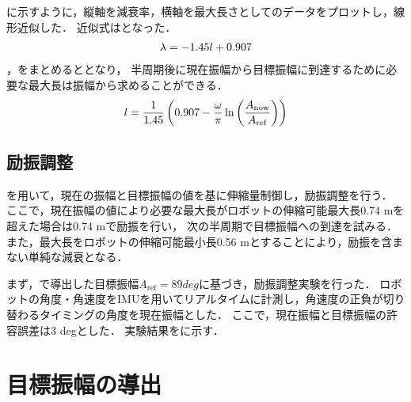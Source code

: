         \figref{}に示すように，縦軸を減衰率，横軸を最大長さとしてのデータをプロットし，線形近似した．
        近似式はとなった．
        \begin{eqnarray}
          \equlabel{length relation}
          \lambda=-1.45l+0.907
        \end{eqnarray}
        ，をまとめるととなり，
        半周期後に現在振幅から目標振幅に到達するために必要な最大長は振幅から求めることができる．
        \begin{eqnarray}
          \equlabel{l status}
          l=\frac{1}{1.45}\left(0.907-\frac{\omega}{\pi}\ln{\left(\frac{A_{\mathrm{now}}}{A_{\mathrm{ref}}}\right)}\right)
        \end{eqnarray}
        

        \subsection{励振調整}
        
        を用いて，現在の振幅と目標振幅の値を基に伸縮量制御し，励振調整を行う．
        ここで，現在振幅の値により必要な最大長がロボットの伸縮可能最大長0.74 mを超えた場合は0.74 mで励振を行い，
        次の半周期で目標振幅への到達を試みる．
        また，最大長をロボットの伸縮可能最小長0.56 mとすることにより，励振を含まない単純な減衰となる．

        まず，で導出した目標振幅$A_{\mathrm{ref}}=89 deg$に基づき，励振調整実験を行った．
        ロボットの角度・角速度をIMUを用いてリアルタイムに計測し，角速度の正負が切り替わるタイミングの角度を現在振幅とした．
        ここで，現在振幅と目標振幅の許容誤差は3 degとした．
        実験結果を\figref{}に示す．


        \section{目標振幅の導出}
          

